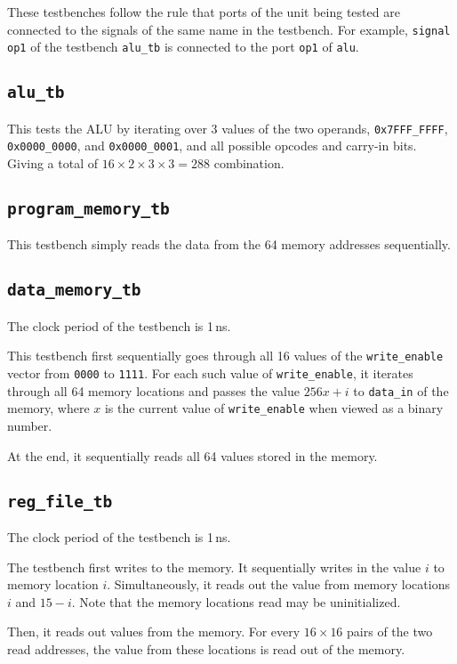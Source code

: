 \documentclass[a4paper]{scrartcl}
\renewcommand{\tt}{\texttt}
\begin{document}
These testbenches follow the rule that ports of the unit being tested are connected to the signals of the same name in the testbench. For example, \texttt{signal op1} of the testbench \tt{alu_tb} is connected to the port \tt{op1} of \tt{alu}.

\subsection*{\tt{alu_tb}}
This tests the ALU by iterating over 3 values of the two operands, \tt{0x7FFF_FFFF}, \tt{0x0000_0000}, and \tt{0x0000_0001}, and all possible opcodes and carry-in bits. Giving a total of $16 \times 2 \times 3 \times 3 = 288$ combination.

\subsection*{\tt{program_memory_tb}}
This testbench simply reads the data from the 64 memory addresses sequentially.

\subsection*{\tt{data_memory_tb}}
The clock period of the testbench is 1\,ns.

This testbench first sequentially goes through all 16 values of the \tt{write_enable} vector from \tt{0000} to \tt{1111}. For each such value of \tt{write_enable}, it iterates through all 64 memory locations and passes the value $256x + i$ to \tt{data_in} of the memory, where $x$ is the current value of \tt{write_enable} when viewed as a binary number.

At the end, it sequentially reads all 64 values stored in the memory.

\subsection*{\tt{reg_file_tb}}
The clock period of the testbench is 1\,ns.

The testbench first writes to the memory. It sequentially writes in the value $i$ to memory location $i$. Simultaneously, it reads out the value from memory locations $i$ and $15 - i$. Note that the memory locations read may be uninitialized.

Then, it reads out values from the memory. For every $16 \times 16$ pairs of the two read addresses, the value from these locations is read out of the memory.
\end{document}
